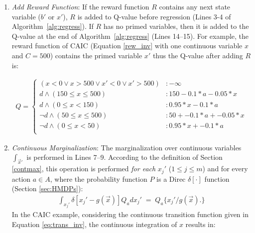 \documentclass[twoside,11pt]{article}
\begin{document}
\begin{enumerate}
\item {\it Add Reward Function}: If the reward function $R$ contains any next state variable ($b'$ or $x'$), $R$ is added to Q-value before regression (Lines 3-4 of Algorithm~\ref{alg:regress}). If $R$ has no primed variables, then it is added to the Q-value at the end of Algorithm~\ref{alg:regress} (Lines 14--15). For example, the reward function of \textsc{CAIC} (Equation \ref{rew_inv} with one continuous variable $x$ and $C=500$) contains the primed variable $x'$ thus the Q-value after adding $R$ is: 

{%
\begin{align}
Q = \begin{cases}
(x < 0 \vee x >500 \vee x'< 0 \vee x' > 500) &: -\infty \\
d \land (150 \leq x \leq 500) &:  150 - 0.1 * a - 0.05 * x \\
d \land (0 \leq x < 150) &:  0.95 * x - 0.1 * a \\
\neg d \land (50 \leq x \leq 500) &: 50 + -0.1 * a+ -0.05 * x \\
\neg d \land (0 \leq x < 50) &:  0.95 * x + -0.1 * a\\
\end{cases} \nonumber
\end{align}}
\item {\it Continuous Marginalization}: The marginalization over continuous variables $\int_{\vec{x}'}$ is performed in Lines 7--9. According to the  definition of Section \ref{contmax},  this operation is performed \emph{for each}
$x_j'$ ($1 \leq j \leq m$) and for every action $a \in A$, where the probability function $P$ is a Direc $\delta [\cdot]$ function (Section \ref{sec:HMDPs}): 
\begin{align*}
\int_{x_j'} \delta[x_j' - g(\vec{x})] Q_a dx_j' \; = \; Q_a \{x_j' / g(\vec{x}). \}  
\end{align*} 
In the \textsc{CAIC} example, considering the continuous transition function given in Equation \ref{eq:trans_inv}, the continuous integration of $x$ results in: 


\end{enumerate}
\end{document}
